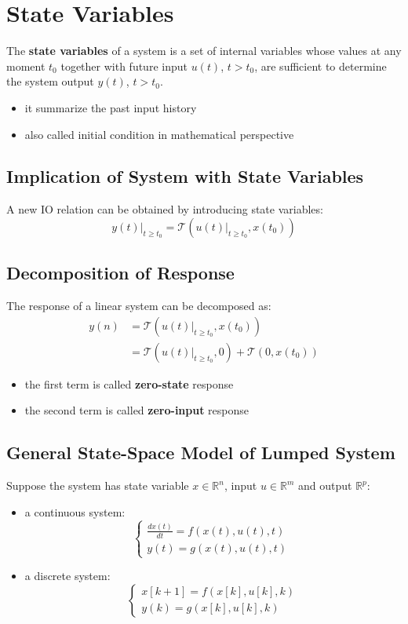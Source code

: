 \documentclass[10pt,a4paper,oneside]{article}
\begin{document}
\section{State Variables}
The \textbf{state variables} of a system is a set of internal variables whose values at any moment $t_0$ together with future input $u(t)$, $t>t_0$, are sufficient to determine the system output $y(t)$, $t>t_0$.
\begin{itemize}
	\item it summarize the past input history
	\item also called initial condition in mathematical perspective
\end{itemize}

\subsection{Implication of System with State Variables}
A new IO relation can be obtained by introducing state variables:
\[
y(t) | _{t \geq t_0} = \mathcal{T} \left(u(t) | _{t\geq t_0} , x(t_0)\right)
\]

\subsection{Decomposition of Response}
The response of a linear system can be decomposed as:
\begin{align*}
y(n) &= \mathcal{T} \left(u(t) | _{t\geq t_0} , x(t_0)\right)\\
&=\mathcal{T} \left(u(t) | _{t\geq t_0} , 0\right) +\mathcal{T} \left(0, x(t_0)\right)
\end{align*}
\begin{itemize}
	\item the first term is called \textbf{zero-state} response
	\item the second term is called \textbf{zero-input} response
\end{itemize}

\subsection{General State-Space Model of Lumped System}
Suppose the system has state variable $x \in \mathbb{R}^n$, input $u \in \mathbb{R}^m$ and output $\mathbb{R}^p$:
\begin{itemize}
	\item a continuous system:
	\[
	\left\{
	\begin{array}{ll}
	\frac{dx(t)}{dt} = f(x(t), u(t), t)\\
	y(t) = g(x(t), u(t), t)\
	\end{array}\right.
	\]
	\item a discrete system:
	\[
	\left\{
	\begin{array}{ll}
	x[k+1] = f(x[k], u[k], k)\\
	y(k) = g(x[k], u[k], k)\
	\end{array}\right.
	\]
\end{itemize}
\end{document}
